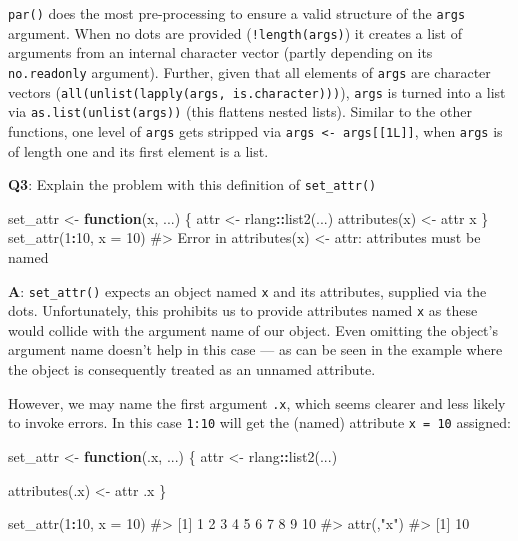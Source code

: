 \documentclass[
]{krantz}
\makeatletter
\newenvironment{Shaded}{\begin{snugshade}}{\end{snugshade}}
\newcommand{\CommentTok}[1]{\textcolor[rgb]{0.56,0.35,0.01}{\textit{#1}}}
\newcommand{\ControlFlowTok}[1]{\textcolor[rgb]{0.13,0.29,0.53}{\textbf{#1}}}
\newcommand{\DataTypeTok}[1]{\textcolor[rgb]{0.13,0.29,0.53}{#1}}
\newcommand{\DecValTok}[1]{\textcolor[rgb]{0.00,0.00,0.81}{#1}}
\newcommand{\KeywordTok}[1]{\textcolor[rgb]{0.13,0.29,0.53}{\textbf{#1}}}
\newcommand{\NormalTok}[1]{#1}
\newcommand{\OperatorTok}[1]{\textcolor[rgb]{0.81,0.36,0.00}{\textbf{#1}}}
\newcommand{\StringTok}[1]{\textcolor[rgb]{0.31,0.60,0.02}{#1}}
\newenvironment{kframe}{%
\medskip{}
\setlength{\fboxsep}{.8em}
 \def\at@end@of@kframe{}%
 \ifinner\ifhmode%
  \def\at@end@of@kframe{\end{minipage}}%
  \begin{minipage}{\columnwidth}%
 \fi\fi%
 \def\FrameCommand##1{\hskip\@totalleftmargin \hskip-\fboxsep
 \colorbox{shadecolor}{##1}\hskip-\fboxsep
     \hskip-\linewidth \hskip-\@totalleftmargin \hskip\columnwidth}%
 \MakeFramed {\advance\hsize-\width
   \@totalleftmargin\z@ \linewidth\hsize
   \@setminipage}}%
 {\par\unskip\endMakeFramed%
 \at@end@of@kframe}
\renewenvironment{Shaded}{\begin{kframe}}{\end{kframe}}
\renewcommand{\KeywordTok} [1]{\textcolor[rgb]{0.00,0.44,0.13}{{#1}}}
\renewcommand{\DataTypeTok}[1]{\textcolor[rgb]{0.56,0.13,0.00}{{#1}}}
\renewcommand{\DecValTok}  [1]{\textcolor[rgb]{0.25,0.63,0.44}{{#1}}}
\renewcommand{\StringTok}  [1]{\textcolor[rgb]{0.25,0.44,0.63}{{#1}}}
\renewcommand{\CommentTok} [1]{\textcolor[rgb]{0.38,0.63,0.69}{{#1}}}
\renewcommand{\NormalTok}  [1]{{#1}}
\makeatother
\begin{document}
\texttt{par()} does the most pre-processing to ensure a valid structure of the \texttt{args} argument. When no dots are provided (\texttt{!length(args)}) it creates a list of arguments from an internal character vector (partly depending on its \texttt{no.readonly} argument). Further, given that all elements of \texttt{args} are character vectors (\texttt{all(unlist(lapply(args,\ is.character)))}), \texttt{args} is turned into a list via \texttt{as.list(unlist(args))} (this flattens nested lists). Similar to the other functions, one level of \texttt{args} gets stripped via \texttt{args\ \textless{}-\ args{[}{[}1L{]}{]}}, when \texttt{args} is of length one and its first element is a list.

\textbf{{Q3}}: Explain the problem with this definition of \texttt{set\_attr()}

\begin{Shaded}
\begin{Highlighting}[]
\NormalTok{set_attr <-}\StringTok{ }\ControlFlowTok{function}\NormalTok{(x, ...) \{}
\NormalTok{  attr <-}\StringTok{ }\NormalTok{rlang}\OperatorTok{::}\KeywordTok{list2}\NormalTok{(...)}
  \KeywordTok{attributes}\NormalTok{(x) <-}\StringTok{ }\NormalTok{attr}
\NormalTok{  x}
\NormalTok{\}}
\KeywordTok{set_attr}\NormalTok{(}\DecValTok{1}\OperatorTok{:}\DecValTok{10}\NormalTok{, }\DataTypeTok{x =} \DecValTok{10}\NormalTok{)}
\CommentTok{#> Error in attributes(x) <- attr: attributes must be named}
\end{Highlighting}
\end{Shaded}

\textbf{{A}}: \texttt{set\_attr()} expects an object named \texttt{x} and its attributes, supplied via the dots. Unfortunately, this prohibits us to provide attributes named \texttt{x} as these would collide with the argument name of our object. Even omitting the object's argument name doesn't help in this case --- as can be seen in the example where the object is consequently treated as an unnamed attribute.

However, we may name the first argument \texttt{.x}, which seems clearer and less likely to invoke errors. In this case \texttt{1:10} will get the (named) attribute \texttt{x\ =\ 10} assigned:

\begin{Shaded}
\begin{Highlighting}[]
\NormalTok{set_attr <-}\StringTok{ }\ControlFlowTok{function}\NormalTok{(.x, ...) \{}
\NormalTok{  attr <-}\StringTok{ }\NormalTok{rlang}\OperatorTok{::}\KeywordTok{list2}\NormalTok{(...)}
  
  \KeywordTok{attributes}\NormalTok{(.x) <-}\StringTok{ }\NormalTok{attr}
\NormalTok{  .x}
\NormalTok{\}}

\KeywordTok{set_attr}\NormalTok{(}\DecValTok{1}\OperatorTok{:}\DecValTok{10}\NormalTok{, }\DataTypeTok{x =} \DecValTok{10}\NormalTok{)}
\CommentTok{#>  [1]  1  2  3  4  5  6  7  8  9 10}
\CommentTok{#> attr(,"x")}
\CommentTok{#> [1] 10}
\end{Highlighting}
\end{Shaded}
\end{document}

